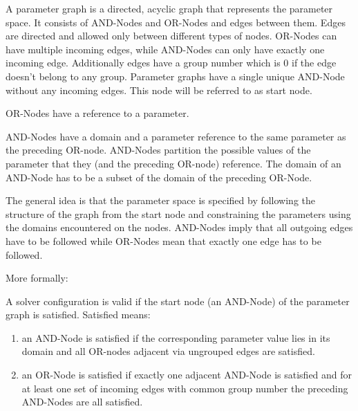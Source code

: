 \begin{definition}
A parameter graph is a directed, acyclic graph that represents the parameter space. It consists of AND-Nodes and OR-Nodes and edges between them. Edges are directed and allowed only
between different types of nodes. OR-Nodes can have multiple incoming edges, while AND-Nodes can only have exactly one incoming edge. Additionally edges have a group number which is 0 if the edge doesn't belong to any group.
Parameter graphs have a single unique AND-Node without any incoming edges. This node will be referred to as start node.
\end{definition}

\begin{definition}
OR-Nodes have a reference to a parameter.
\end{definition}

\begin{definition}
AND-Nodes have a domain and a parameter reference to the same parameter as the preceding OR-node.
AND-Nodes partition the possible values of the parameter that they (and the preceding OR-node) reference.
The domain of an AND-Node has to be a subset of the domain of the preceding OR-Node.
\end{definition}

The general idea is that the parameter space is specified by following the structure of the graph from the start node and constraining the parameters using the domains encountered
on the nodes.
AND-Nodes imply that all outgoing edges have to be followed while OR-Nodes mean that exactly one edge has to be followed.

More formally:
\begin{definition}
A solver configuration is valid if the start node (an AND-Node) of the parameter graph is satisfied. Satisfied means:
\begin{enumerate}
\item an AND-Node is satisfied if the corresponding parameter value lies in its domain and all OR-nodes adjacent via ungrouped edges are satisfied.
\item an OR-Node is satisfied if exactly one adjacent AND-Node is satisfied and for at least one set of incoming edges with common group number the preceding AND-Nodes are all satisfied.
\end{enumerate}
\end{definition}

\clearpage

